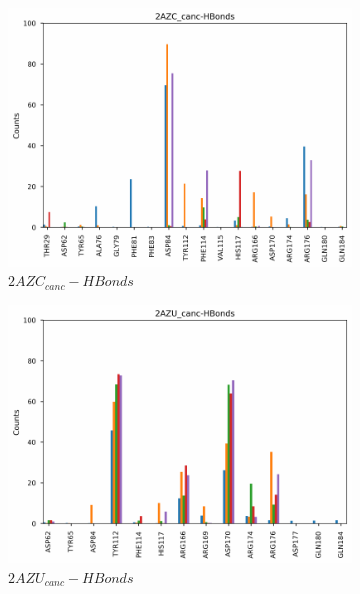\begin{figure}[!ht]
\centering
   \begin{subfigure}{.45\textwidth}
     \centering
     \includegraphics[width=.95\linewidth]{chapter4/2AZC_canc/2AZC_canc-HBonds.pdf}
     \caption{$2AZC_{canc}-HBonds$}
     \label{fig:2AZC_canc-HBonds}
   \end{subfigure}
   \begin{subfigure}{.45\textwidth}
     \centering
     \includegraphics[width=.95\linewidth]{chapter4/2AZU_canc/2AZU_canc-HBonds.pdf}
     \caption{$2AZU_{canc}-HBonds$}
     \label{fig:2AZU_canc-HBonds}
   \end{subfigure}
   \\
   \begin{subfigure}{.45\textwidth}
     \centering

\end{subfigure}
\end{figure}
